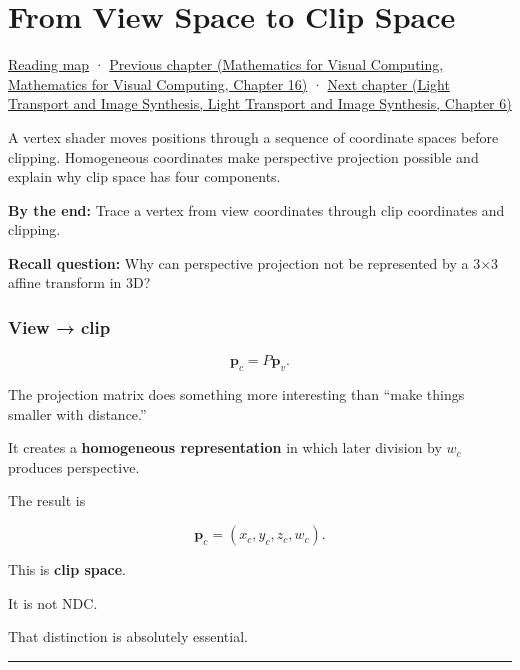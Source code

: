 \hypertarget{03-visual-computing-i-ch013}{}
\chapter{From View Space to Clip Space}\label{stagechapter:03-visual-computing-i-ch013}\label{03-visual-computing-i-ch013-from-view-space-to-clip-space}

\hyperref[volume-reading-map]{Reading map} · \href{../02-Mathematics-for-Visual-Computing/main.pdf\#nameddest=03-visual-computing-i-ch012-probability-statistics-and-uncertainty}{Previous chapter (Mathematics for Visual Computing, Mathematics for Visual Computing, Chapter 16)} · \href{../04-Light-Transport-and-Image-Synthesis/main.pdf\#nameddest=03-visual-computing-i-ch014-transparency-blending-and-visibility}{Next chapter (Light Transport and Image Synthesis, Light Transport and Image Synthesis, Chapter 6)}

A vertex shader moves positions through a sequence of coordinate spaces before clipping. Homogeneous coordinates make perspective projection possible and explain why clip space has four components.

\textbf{By the end:} Trace a vertex from view coordinates through clip coordinates and clipping.

\textbf{Recall question:} Why can perspective projection not be represented by a 3×3 affine transform in 3D?

\subsection{View → clip}\label{03-visual-computing-i-ch013-view-clip}

\[
\mathbf p_c=P\mathbf p_v.
\]

The projection matrix does something more interesting than ``make things smaller with distance.''

It creates a \textbf{homogeneous representation} in which later division by \(w_c\) produces perspective.

The result is

\[
\mathbf p_c=
(x_c,y_c,z_c,w_c).
\]

This is \textbf{clip space}.

It is not NDC.

That distinction is absolutely essential.

\begin{center}\rule{0.5\linewidth}{0.5pt}\end{center}

